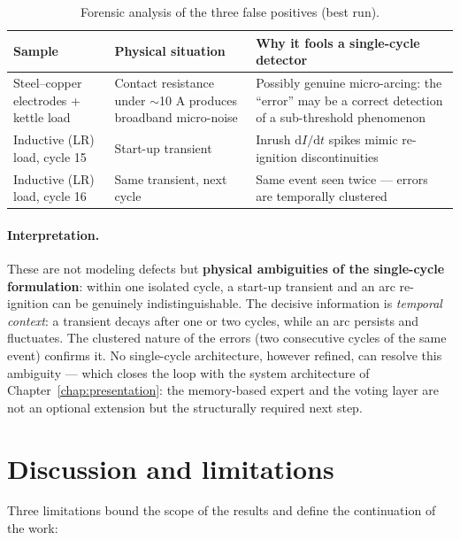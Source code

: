 \begin{table}[H]
\centering
\caption{Forensic analysis of the three false positives (best run).}
\label{tab:fp}
\renewcommand{\arraystretch}{1.35}
\small
\begin{tabular}{|p{3.6cm}|p{5.2cm}|p{5.2cm}|}
\hline
\textbf{Sample} & \textbf{Physical situation} & \textbf{Why it fools a single-cycle detector} \\
\hline
Steel--copper electrodes + kettle load & Contact resistance under $\sim$10 A produces broadband micro-noise & Possibly genuine micro-arcing: the ``error'' may be a correct detection of a sub-threshold phenomenon \\
\hline
Inductive (LR) load, cycle 15 & Start-up transient & Inrush $\mathrm{d}I/\mathrm{d}t$ spikes mimic re-ignition discontinuities \\
\hline
Inductive (LR) load, cycle 16 & Same transient, next cycle & Same event seen twice --- errors are temporally clustered \\
\hline
\end{tabular}
\end{table}

\paragraph{Interpretation.} These are not modeling defects but \textbf{physical ambiguities of the single-cycle formulation}: within one isolated cycle, a start-up transient and an arc re-ignition can be genuinely indistinguishable. The decisive information is \emph{temporal context}: a transient decays after one or two cycles, while an arc persists and fluctuates. The clustered nature of the errors (two consecutive cycles of the same event) confirms it. No single-cycle architecture, however refined, can resolve this ambiguity --- which closes the loop with the system architecture of Chapter~\ref{chap:presentation}: the memory-based expert and the voting layer are not an optional extension but the structurally required next step.

\section{Discussion and limitations}

Three limitations bound the scope of the results and define the continuation of the work:

